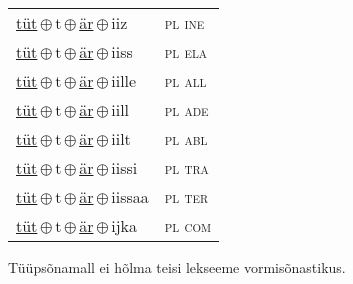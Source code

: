 \begin{minipage}{\textwidth}
\begin{sideways}
\begin{tabular}{l l}
\underline{tüt}\,$\oplus$\,t\,$\oplus$\,\underline{är}\,$\oplus$\,iiz & \textsc{ pl ine } \\
\underline{tüt}\,$\oplus$\,t\,$\oplus$\,\underline{är}\,$\oplus$\,iiss & \textsc{ pl ela } \\
\underline{tüt}\,$\oplus$\,t\,$\oplus$\,\underline{är}\,$\oplus$\,iille & \textsc{ pl all } \\
\underline{tüt}\,$\oplus$\,t\,$\oplus$\,\underline{är}\,$\oplus$\,iill & \textsc{ pl ade } \\
\underline{tüt}\,$\oplus$\,t\,$\oplus$\,\underline{är}\,$\oplus$\,iilt & \textsc{ pl abl } \\
\underline{tüt}\,$\oplus$\,t\,$\oplus$\,\underline{är}\,$\oplus$\,iissi & \textsc{ pl tra } \\
\underline{tüt}\,$\oplus$\,t\,$\oplus$\,\underline{är}\,$\oplus$\,iissaa & \textsc{ pl ter } \\
\underline{tüt}\,$\oplus$\,t\,$\oplus$\,\underline{är}\,$\oplus$\,ijka & \textsc{ pl com } \\
\end{tabular}
\end{sideways}
\label{tab:tüüpsõnamall-tütär}

\end{minipage}

 
\vspace{1em}
\noindent Tüüpsõnamall  ei hõlma teisi lekseeme vormi\-sõnastikus.
